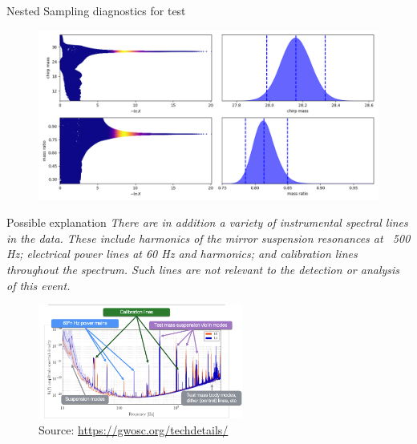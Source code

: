 \documentclass[
10pt,
aspectratio=169,
]{beamer}
\begin{document}
\begin{frame}{Nested Sampling diagnostics for test}
    \begin{figure}
        \centering
        \includegraphics[width=\textwidth]{example_checkpoint_trace.png}
    \end{figure}
\end{frame}
\begin{frame}{Possible explanation}
\textit{There are in addition a variety of instrumental spectral lines in the data. These include harmonics of the mirror suspension resonances at ~500 Hz; electrical power lines at 60 Hz and harmonics; and calibration lines throughout the spectrum. Such lines are not relevant to the detection or analysis of this event.}
\begin{figure}
    \centering
    \includegraphics[width=0.6\textwidth]{spectrum_lines.png}
    \caption{Source: \url{https://gwosc.org/techdetails/}}
\end{figure}

\end{frame}
\end{document}
